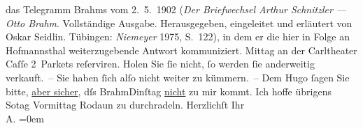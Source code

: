 \begin{ledgroupsized}[t]{13cm}
{{{                  das Telegramm Brahms vom
                     2. 5. 1902 (\emph{Der Briefwechsel Arthur Schnitzler — Otto Brahm}.
                     Vollständige Ausgabe. Herausgegeben, eingeleitet und erläutert von Oskar
                     Seidlin. Tübingen: \emph{Niemeyer}{ }1975, S. 122), in dem er die hier in Folge an Hofmannsthal weiterzugebende Antwort
                  kommuniziert.}}}\label{K_L01217_1h}{ }Mittag an der Carltheater Caſſe
               2 Parkets reſerviren. Holen Sie ſie nicht, ſo werden ſie anderweitig {\pb}verkauft. – Sie haben ſich alſo nicht weiter zu
               kümmern. –\pend
           \pstart
           Dem Hugo ſagen Sie bitte, \uline{aber sicher}, dſs BrahmDinſtag{ }\uline{nicht} zu mir kommt.\pend
           \pstart
           Ich hoffe übrigens So{\geminationn}tag{ }Vormittag{ }Rodaun zu durchradeln.\pend
           \pstart
           Herzlichſt Ihr{\\[\baselineskip]}\spacefill\mbox{A.}\pend
           \leftskip=0em{}\endnumbering{}\end{ledgroupsized}  \newcommand{\dateiname}{L01217}\newcommand{\titel}{Arthur Schnitzler an Richard Beer-Hofmann, 2. [5.?] 1902}\newcommand{\editorInnen}{Martin Anton Müller und Gerd-Hermann Susen}
            \footnotesize
\begin{ledgroupsized}[t]{11.5cm}
\end{ledgroupsized}
         
      